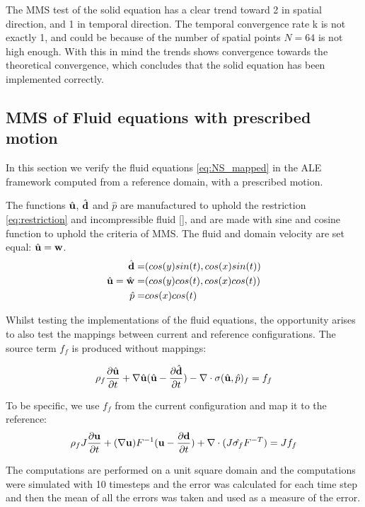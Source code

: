 The MMS test of the solid equation has a clear trend toward 2 in spatial direction, and 1 in temporal direction. The temporal convergence rate k is not exactly 1, and could be because of the number of spatial points $N=64$ is not high enough. With this in mind the trends shows convergence towards the theoretical convergence, which concludes that the solid equation has been implemented correctly.

\subsection{MMS of Fluid equations with prescribed motion}
In this section we verify the fluid equations \eqref{eq:NS_mapped} in the ALE framework computed from a reference domain, with a prescribed motion.

The functions $\hat{\bold{u}}$, $\hat{\bold{d}}$ and $\hat{p}$ are manufactured to uphold the restriction \eqref{eq:restriction} and incompressible fluid \eqref{}, and are made with sine and cosine function to uphold the criteria of MMS. The fluid and domain velocity are set equal: $\hat{\bold{u}} = \bold{w}$. 
\begin{align*}
\hat{\bold{d}} =& ( cos(y)sin(t) , cos(x)sin(t) )\\
\hat{\bold{u}} = \hat{\bold{w}}=& ( cos(y)cos(t), cos(x)cos(t) ) \\
\hat{p} =& cos(x)cos(t)
\end{align*}

Whilst testing the implementations of the fluid equations, the opportunity arises to also test the mappings between current and reference configurations.
The source term $f_f$ is produced without mappings:

$$ \rho_f \frac{\partial \hat{\bold{u}}}{\partial t}  +  \nabla \hat{\bold{u}} (\hat{\bold{u}} - \frac{\partial \hat{\bold{d}}}{\partial t})  -  \nabla \cdot \sigma(\hat{\bold{u}}, \hat{p})_f  = f_f $$

To be specific, we use $f_f$ from the current configuration and map it to the reference:
$$ \rho_f J \frac{\partial \bold{u}}{\partial t} + (\nabla \bold{u})F^{-1}(\bold{u}-\frac{\partial \bold{d}}{\partial t})  + \nabla \cdot( J \hat{\sigma_f} F^{-T}) = J f_f$$

The computations are performed on a unit square domain and the computations were simulated with 10 timesteps and the error was calculated for each time step and then the mean of all the errors was taken and used as a measure of the error.

